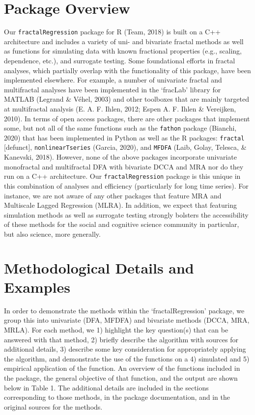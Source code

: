 \documentclass[
  man]{apa6}
\begin{document}
\hypertarget{package-overview}{%
\section{Package Overview}\label{package-overview}}

Our \texttt{fractalRegression} package for R
(Team, 2018) is built on a C++
architecture and includes a variety of uni- and bivariate fractal
methods as well as functions for simulating data with known fractional
properties (e.g., scaling, dependence, etc.), and surrogate testing.
Some foundational efforts in fractal analyses, which partially overlap
with the functionality of this package, have been implemented elsewhere.
For example, a number of univariate fractal and multifractal analyses
have been implemented in the `fracLab' library for MATLAB (Legrand \& Véhel, 2003)
and other toolboxes that are mainly targeted at multifractal analysis
(E. A. F. Ihlen, 2012; Espen A. F. Ihlen \& Vereijken, 2010). In terms of
open access packages, there are other packages that implement some, but
not all of the same functions such as the \texttt{fathon} package
(Bianchi, 2020) that has been implemented in Python as well as the R
packages: \texttt{fractal} {[}defunct{]}, \texttt{nonlinearTseries}
(Garcia, 2020), and \texttt{MFDFA}
(Laib, Golay, Telesca, \& Kanevski, 2018). However, none of the above packages
incorporate univariate monofractal and multifractal DFA with bivariate
DCCA and MRA nor do they run on a C++ architecture. Our
\texttt{fractalRegression} package is this unique in this combination of
analyses and efficiency (particularly for long time series). For
instance, we are not aware of any other packages that feature MRA and
Multiscale Lagged Regression (MLRA). In addition, we expect that
featuring simulation methods as well as surrogate testing strongly
bolsters the accessibility of these methods for the social and cognitive
science community in particular, but also science, more generally.

\hypertarget{methodological-details-and-examples}{%
\section{Methodological Details and Examples}\label{methodological-details-and-examples}}

In order to demonstrate the methods within the `fractalRegression'
package, we group this into univariate (DFA, MFDFA) and bivariate
methods (DCCA, MRA, MRLA). For each method, we 1) highlight the key
question(s) that can be answered with that method, 2) briefly describe
the algorithm with sources for additional details, 3) describe some key
consideration for appropriately applying the algorithm, and demonstrate
the use of the functions on a 4) simulated and 5) empirical application
of the function. An overview of the functions included in the package,
the general objective of that function, and the output are shown below
in Table 1. The additional details are included in the sections
corresponding to those methods, in the package documentation, and in the
original sources for the methods.
\end{document}
